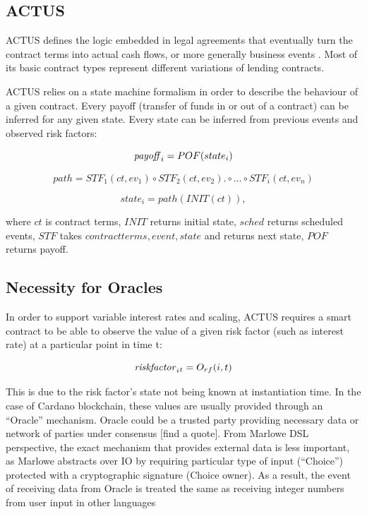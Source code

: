 \documentclass[runningheads]{llncs}
\begin{document}
\subsection{ACTUS}

ACTUS defines the logic embedded in legal agreements that eventually
turn the contract terms into actual cash flows, or more generally
business events \cite{actus}. Most of its basic contract types represent
different variations of lending contracts.

ACTUS relies on a state machine formalism in order to describe the
behaviour of a given contract. Every payoff (transfer of funds in
or out of a contract) can be inferred for any given state. Every state
can be inferred from previous events and observed risk factors:

\noindent 
\begin{equation}
\mbox{\emph{payoff}}_{i}=POF(state_{i})
\end{equation}

\noindent 
\begin{equation}
path=STF_{1}(ct,ev_{1})\circ STF_{2}(ct,ev_{2}).\circ\ldots\circ STF_{i}(ct,ev_{n})
\end{equation}

\noindent 
\begin{equation}
state_{i}=path(INIT(ct)),
\end{equation}

where $ct$ is contract terms, $INIT$ returns initial state, $sched$
returns scheduled events, $STF$ takes ${contractterms,event,state}$
and returns next state, $POF$ returns payoff.

\subsection{Necessity for Oracles}

In order to support variable interest rates and scaling, ACTUS requires
a smart contract to be able to observe the value of a given risk factor
(such as interest rate) at a particular point in time t:

\noindent 
\begin{equation}
\mbox{\emph{riskfactor}}_{i}{}_{t}=O_{rf}(i,t)
\end{equation}

This is due to the risk factor's state not being known at instantiation
time. In the case of Cardano blockchain, these values are usually
provided through an ``Oracle'' mechanism\cite{oracles}. Oracle
could be a trusted party providing necessary data or network of parties
under consensus {[}find a quote{]}. From Marlowe DSL perspective,
the exact mechanism that provides external data is less important,
as Marlowe abstracts over IO by requiring particular type of input
(``Choice'') protected with a cryptographic signature (Choice owner).
As a result, the event of receiving data from Oracle is treated the
same as receiving integer numbers from user input in other languages
\end{document}
